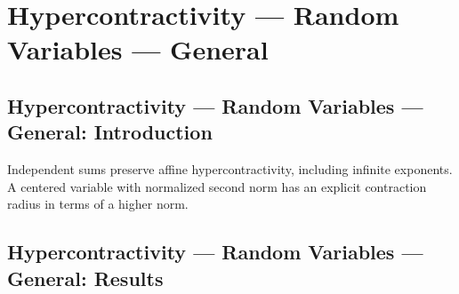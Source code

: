 \section{Hypercontractivity --- Random Variables --- General}
\subsection*{Hypercontractivity --- Random Variables --- General: Introduction}
Independent sums preserve affine hypercontractivity, including infinite exponents. A centered variable with normalized second norm has an explicit contraction radius in terms of a higher norm.

\subsection*{Hypercontractivity --- Random Variables --- General: Results}


